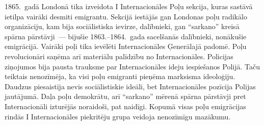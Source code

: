 \documentclass[twoside,a5paper,12pt,fleqn,openany]{extbook}
\begin{document}
1865.~gadā Londonā tika izveidota I Internacionāles Poļu sekcija, kuras sastāvā ietilpa vairāki desmiti emigrantu. Sekcijā iestājās gan Londonas poļu radikālo organizāciju, kam bija sociālistiska ievirze, dalībnieki, gan ``sarkano'' kreisā spārna pārstāvji~--- bijušie 1863.--1864.~gada sacelšanās dalībnieki, nonākušie emigrācijā. Vairāki poļi tika ievēlēti Internacionāles Ģenerālajā padomē. Poļu revolucionāri saņēma arī materiālu palīdzību no Internacionāles. Policijas ziņojumos bija pausta trauksme par Internacionāles ideju iespiešanos Polijā. Taču teiktais nenozīmēja, ka visi poļu emigranti pieņēma marksisma ideoloģiju. Daudzus piesaistīja nevis sociālistiskie ideāli, bet Internacionāles pozīcija Polijas jautājumā. Daļa poļu demokrātu, arī ``sarkano'' mērenā spārna pārstāvji pret Internacionāli izturējās noraidoši, pat naidīgi. Kopumā visas poļu emigrācijas rindās I Internacionāles piekritēju grupa veidoja nenozīmīgu mazākumu.
\end{document}
